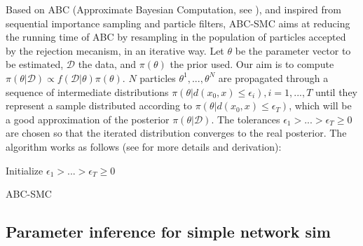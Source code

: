 \documentclass[11pt]{article}
\begin{document}
Based on ABC (Approximate Bayesian Computation, see \cite{ABC}), and inspired from sequential importance sampling and particle filters, ABC-SMC aims at reducing the running time of ABC by resampling in the population of particles accepted by the rejection mecanism, in an iterative way. Let $\theta$ be the parameter vector to be estimated, $\mathcal{D}$ the data, and $\pi(\theta)$ the prior used. Our aim is to compute $\pi(\theta|\mathcal{D}) \propto f(\mathcal{D}|\theta)\pi(\theta)$. $N$ particles $\theta^{1}, ..., \theta^{N}$ are propagated through a sequence of intermediate distributions $\pi(\theta|d(x_0, x)\leq\epsilon_i), i=1,...,T$ until they represent a sample distributed according to $\pi(\theta|d(x_0, x)\leq\epsilon_T)$, which will be a good approximation of the posterior $\pi(\theta|\mathcal{D})$. The tolerances $\epsilon_1 > ... > \epsilon_T \geq 0$ are chosen so that the iterated distribution converges to the real posterior. The algorithm works as follows (see \cite{ABCSMC} for more details and derivation):

\begin{algorithm}[H]
\SetAlgoLined
 Initialize $\epsilon_1 > ... > \epsilon_T \geq 0$\;
 \caption{ABC-SMC}
\end{algorithm}

\subsection{Parameter inference for simple network sim}
\end{document}
